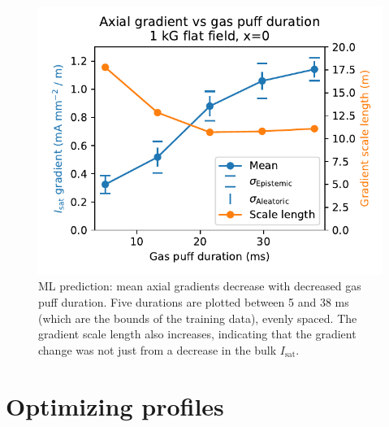\begin{figure}
	\centering
	\includegraphics[width=\textwidth]{figures/axial-grad_gas-puff.pdf}
	\caption[size=12]{\label{fig:axial-grad_gas-puff.pdf}ML prediction: mean axial gradients decrease with decreased gas puff duration. Five durations are plotted between 5 and 38 ms (which are the bounds of the training data), evenly spaced. The gradient scale length also increases, indicating that the gradient change was not just from a decrease in the bulk $I_\text{sat}$.}
\end{figure}

\section{Optimizing profiles}
\label{sec:optimization}


